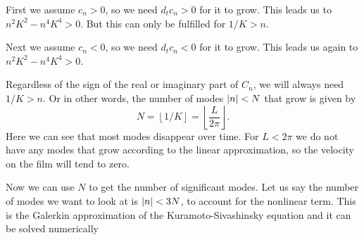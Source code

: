 First we assume $c_n > 0$, so we need $d_t c_n > 0$ for it to grow.
This leads us to $n^2 K^2 - n^4 K^4 > 0$. But this can only be fulfilled for $1/K > n$.

Next we assume $c_n < 0$, so we need $d_t c_n < 0$ for it to grow.
This leads us again to $n^2 K^2 - n^4 K^4 > 0$.

Regardless of the sign of the real or imaginary part of $C_n$, we will always need $1/K > n$. Or in other words, the number of modes $\left\vert n \right\vert < N$ that grow is given by
\begin{equation}
  N = \left \lfloor{1/K}\right \rfloor = \left \lfloor{\frac{L}{2\pi}}\right \rfloor.
\end{equation}
Here we can see that most modes disappear over time.
For $L < 2 \pi$ we do not have any modes that grow according to the linear approximation, so the velocity on the film will tend to zero.

Now we can use $N$ to get the number of significant modes.
Let us say the number of modes we want to look at is $\left\vert n \right\vert < 3N$, to account for the nonlinear term.
This is the Galerkin approximation of the Kuramoto-Sivashinsky equation and
it can be solved numerically
